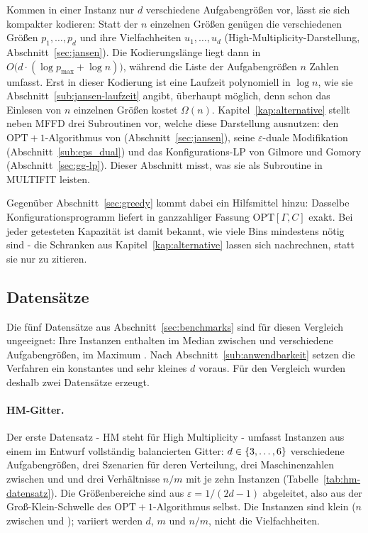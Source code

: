 Kommen in einer Instanz nur $d$ verschiedene Aufgabengrößen vor, lässt sie sich kompakter
kodieren: Statt der $n$ einzelnen Größen genügen die verschiedenen Größen $p_1, \ldots, p_d$ und
ihre Vielfachheiten $u_1, \ldots, u_d$ (High-Multiplicity-Darstellung,
Abschnitt~\ref{sec:jansen}).
Die Kodierungslänge liegt dann in $O\bigl(d \cdot (\log p_{\max} + \log n)\bigr)$, während die
Liste der Aufgabengrößen $n$ Zahlen umfasst.
Erst in dieser Kodierung ist eine Laufzeit polynomiell in $\log n$, wie sie
Abschnitt~\ref{sub:jansen-laufzeit} angibt, überhaupt möglich, denn schon das Einlesen von $n$
einzelnen Größen kostet $\Omega(n)$.
Kapitel~\ref{kap:alternative} stellt neben MFFD drei Subroutinen vor, welche diese Darstellung
ausnutzen: den $\mathrm{OPT}+1$-Algorithmus von \textcite{jansen_solisoba2010}
(Abschnitt~\ref{sec:jansen}), seine $\varepsilon$-duale Modifikation
(Abschnitt~\ref{sub:eps_dual}) und das Konfigurations-LP von Gilmore und Gomory
(Abschnitt~\ref{sec:gg-lp}).
Dieser Abschnitt misst, was sie als Subroutine in MULTIFIT leisten.

Gegenüber Abschnitt~\ref{sec:greedy} kommt dabei ein Hilfsmittel hinzu: Dasselbe
Konfigurationsprogramm liefert in ganzzahliger Fassung $\mathrm{OPT}[\Gamma, C]$ exakt.
Bei jeder getesteten Kapazität ist damit bekannt, wie viele Bins mindestens nötig sind -
die Schranken aus Kapitel~\ref{kap:alternative} lassen sich nachrechnen, statt sie nur zu
zitieren.

\subsection{Datensätze}
\label{sub:hm-datensaetze}

Die fünf Datensätze aus Abschnitt~\ref{sec:benchmarks} sind für diesen Vergleich ungeeignet:
Ihre Instanzen enthalten im Median zwischen \HmDBenchMedianMin{} und \HmDBenchMedianMax{}
verschiedene Aufgabengrößen, im Maximum \HmDBenchMax.
Nach Abschnitt~\ref{sub:anwendbarkeit} setzen die Verfahren ein konstantes und sehr kleines $d$
voraus.
Für den Vergleich wurden deshalb zwei Datensätze erzeugt.

\paragraph{HM-Gitter.}
Der erste Datensatz - HM steht für High Multiplicity - umfasst
\HmInstanzen{} Instanzen aus einem im Entwurf vollständig balancierten Gitter:
$d \in \{3,\dots,6\}$ verschiedene Aufgabengrößen, drei Szenarien für deren
Verteilung, drei Maschinenzahlen zwischen \HmMMin{} und \HmMMax{} und drei Verhältnisse $n/m$
mit je zehn Instanzen (Tabelle~\ref{tab:hm-datensatz}).
Die Größenbereiche sind aus $\varepsilon = 1/(2d-1)$ abgeleitet, also aus der
Groß-Klein-Schwelle des $\mathrm{OPT}+1$-Algorithmus selbst.
Die Instanzen sind klein ($n$ zwischen \HmNMin{} und \HmNMax); variiert werden $d$, $m$ und
$n/m$, nicht die Vielfachheiten.

